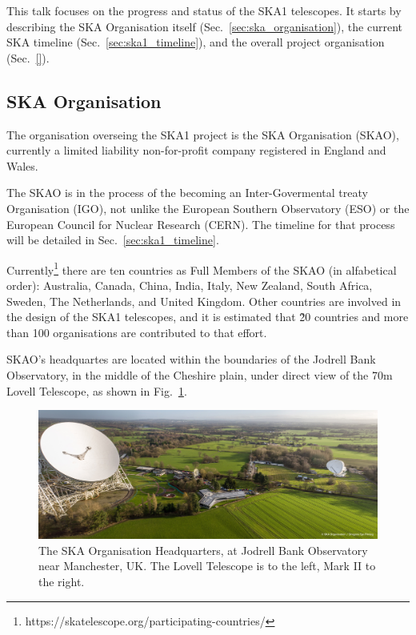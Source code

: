 \documentclass[a4paper,
               biblatex,       %
               keeplastbox,    %
               ]{jacow-2_1}    %
\begin{document}
This talk focuses on the progress and status of the SKA1 telescopes. It starts by describing the SKA Organisation itself (Sec.~\ref{sec:ska_organisation}), the current SKA timeline (Sec.~\ref{sec:ska1_timeline}), and the overall project organisation (Sec.~\ref{}). 

\subsection{SKA Organisation} %
\label{sub:ska_organisation}
The organisation overseing the SKA1 project is the SKA Organisation (SKAO), currently a limited liability non-for-profit company registered in England and Wales.

The SKAO is in the process of the becoming an Inter-Govermental treaty Organisation (IGO), not unlike the European Southern Observatory (ESO) or the European Council for Nuclear Research (CERN). The timeline for that process will be detailed in Sec.~\ref{sec:ska1_timeline}.

Currently\footnote{https://skatelescope.org/participating-countries/} there are ten countries as Full Members of the SKAO (in alfabetical order): Australia, Canada, China, India, Italy, New Zealand, South Africa, Sweden, The Netherlands, and United Kingdom. Other countries are involved in the design of the SKA1 telescopes, and it is estimated that \~20 countries and more than 100 organisations are contributed to that effort.

SKAO's headquartes are located within the boundaries of the Jodrell Bank Observatory, in the middle of the Cheshire plain, under direct view of the 70m Lovell Telescope, as shown in  Fig.~\ref{fig:SKA-HQ-at-Jodrell-Bank}.

\begin{figure}[!htb]
  \centering
    \includegraphics[width=\columnwidth]{SKA-HQ-aerial-panorama_web.jpg}
  \caption{The SKA Organisation Headquarters, at Jodrell Bank Observatory near Manchester, UK. The Lovell Telescope is to the left, Mark II to the right.}
  \label{fig:SKA-HQ-at-Jodrell-Bank}
\end{figure}
\end{document}
